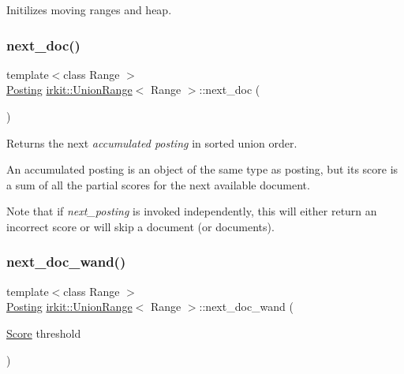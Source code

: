 Initilizes moving ranges and heap. 

\mbox{\label{classirkit_1_1UnionRange_a9161a468e74df4e76cd04104763f7d97}} 
\subsubsection{\texorpdfstring{next\+\_\+doc()}{next\_doc()}}
{\footnotesize\ttfamily template$<$class Range $>$ \\
\mbox{\hyperlink{classirkit_1_1UnionRange_a5f694970419f5a60d7fd41d740556229}{Posting}} \mbox{\hyperlink{classirkit_1_1UnionRange}{irkit\+::\+Union\+Range}}$<$ Range $>$\+::next\+\_\+doc (\begin{DoxyParamCaption}{ }\end{DoxyParamCaption})\hspace{0.3cm}{\ttfamily [inline]}}



Returns the next {\itshape accumulated posting} in sorted union order. 

An accumulated posting is an object of the same type as posting, but its score is a sum of all the partial scores for the next available document.

Note that if {\itshape next\+\_\+posting} is invoked independently, this will either return an incorrect score or will skip a document (or documents). \mbox{\label{classirkit_1_1UnionRange_a6f6bf3aa9d7d273371a9477b88c54737}} 
\subsubsection{\texorpdfstring{next\+\_\+doc\+\_\+wand()}{next\_doc\_wand()}}
{\footnotesize\ttfamily template$<$class Range $>$ \\
\mbox{\hyperlink{classirkit_1_1UnionRange_a5f694970419f5a60d7fd41d740556229}{Posting}} \mbox{\hyperlink{classirkit_1_1UnionRange}{irkit\+::\+Union\+Range}}$<$ Range $>$\+::next\+\_\+doc\+\_\+wand (\begin{DoxyParamCaption}\item[{\mbox{\hyperlink{classirkit_1_1UnionRange_a47fb098a85581f5e33f4203e16245dae}{Score}}}]{threshold }\end{DoxyParamCaption})\hspace{0.3cm}{\ttfamily [inline]}}

